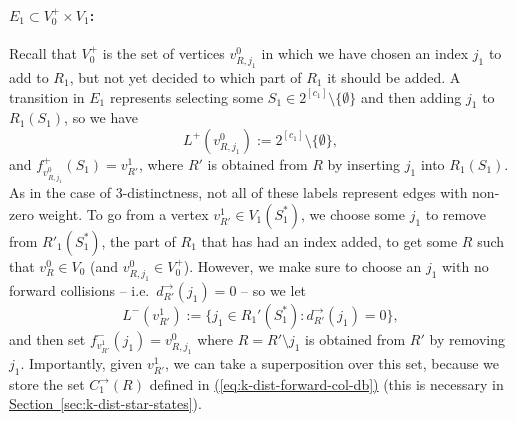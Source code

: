 \documentclass{theoretics}
\newcommand{\eq}[1]{\hyperref[eq:#1]{(\ref*{eq:#1})}}
\renewcommand{\sec}[1]{\hyperref[sec:#1]{Section~\ref*{sec:#1}}}
\renewcommand{\>}{\rangle}
\newcommand{\<}{\langle}
\renewcommand{\(}{\left(}
\renewcommand{\)}{\right)}
\begin{document}
\paragraph{$E_1\subset V_0^+\times V_1$:} Recall that $V_0^+$ is the set of vertices $v_{R,j_1}^0$ in which we have chosen an index $j_1$ to add to $R_1$, but not yet decided to which part of $R_1$ it should be added. A transition in $E_1$ represents selecting some $S_1\in 2^{[c_1]}\setminus\{\emptyset\}$ and then adding $j_1$ to $R_1(S_1)$, so we have 
$$L^+(v_{R,j_1}^0):= 2^{[c_1]}\setminus\{\emptyset\},$$
and $f^+_{v^0_{R,j_1}}(S_1)=v^1_{R'}$, where $R'$ is obtained from $R$ by inserting $j_1$ into $R_1(S_1)$. As in the case of 3-distinctness, not all of these labels represent edges with non-zero weight.
To go from a vertex $v_{R'}^1\in V_1(S_1^*)$, we choose some $j_1$ to remove from $R'_1(S_1^*)$, the part of $R_1$ that has had an index added, to get some $R$ such that $v_R^0\in V_0$ (and $v_{R,j_1}^0\in V_0^+$). However, we make sure to choose an $j_1$ with no forward collisions -- i.e.~$d^{\rightarrow}_{R'}(j_1)=0$ -- so we let
$$L^-(v_{R'}^1):=\{j_1\in R_1'(S_1^*):d_{R'}^{\rightarrow}(j_1)=0\},$$
and then set $f^-_{v_{R'}^1}(j_1)=v_{R,j_1}^0$ where $R=R'\setminus j_1$ is obtained from $R'$ by removing $j_1$. Importantly, given $v^1_{R'}$, we can take a superposition over this set, because we store the set $C^{\rightarrow}_1(R)$ defined in \eq{k-dist-forward-col-db} (this is necessary in \sec{k-dist-star-states}).
\end{document}
